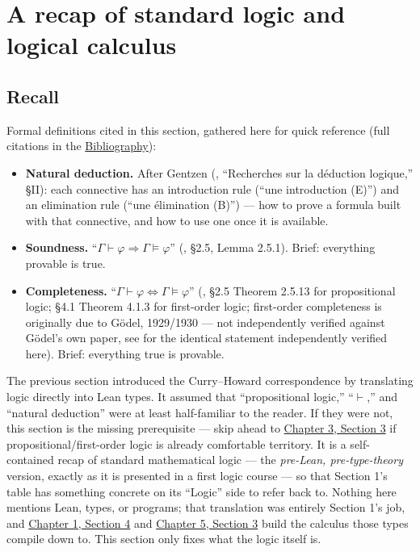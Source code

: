 \section{A recap of standard logic and logical calculus}\label{sec:03-propositions-and-proofs:02-logic-recap:1}

\subsection{Recall}\label{sec:03-propositions-and-proofs:02-logic-recap:2}

Formal definitions cited in this section, gathered here for quick reference (full citations in the \hyperref[sec:root:bibliography:1]{Bibliography}):

\begin{itemize}
\tightlist
\item
  \textbf{Natural deduction.} After Gentzen (\cite{Gentzen1935}, ``Recherches sur la déduction logique,'' §II): each connective has an introduction rule (``une introduction (E)'') and an elimination rule (``une élimination (B)'') --- how to prove a formula built with that connective, and how to use one once it is available.
\item
  \textbf{Soundness.} ``\(\Gamma \vdash \varphi \Rightarrow \Gamma \models
  \varphi\)'' (\cite{VanDalen2013}, §2.5, Lemma 2.5.1). Brief: everything provable is true.
\item
  \textbf{Completeness.} ``\(\Gamma \vdash \varphi \Leftrightarrow \Gamma
  \models \varphi\)'' (\cite{VanDalen2013}, §2.5 Theorem 2.5.13 for propositional logic; §4.1 Theorem 4.1.3 for first-order logic; first-order completeness is originally due to Gödel, 1929/1930 --- not independently verified against Gödel's own paper, see \cite{VanDalen2013} for the identical statement independently verified here). Brief: everything true is provable.
\end{itemize}

The previous section introduced the Curry--Howard correspondence by translating logic directly into Lean types. It assumed that ``propositional logic,'' ``\(\vdash\),'' and ``natural deduction'' were at least half-familiar to the reader. If they were not, this section is the missing prerequisite --- skip ahead to \hyperref[sec:03-propositions-and-proofs:03-theorem-lemma:1]{Chapter 3, Section 3} if propositional/first-order logic is already comfortable territory. It is a self-contained recap of standard mathematical logic --- the \emph{pre-Lean, pre-type-theory} version, exactly as it is presented in a first logic course --- so that Section 1's table has something concrete on its ``Logic'' side to refer back to. Nothing here mentions Lean, types, or programs; that translation was entirely Section 1's job, and \hyperref[sec:01-basics:05-pi-sigma-and-coc:1]{Chapter 1, Section 4} and \hyperref[sec:05-rigor-check:03-typing-rules-and-safety:1]{Chapter 5, Section 3} build the calculus those types compile down to. This section only fixes what the logic itself is.

